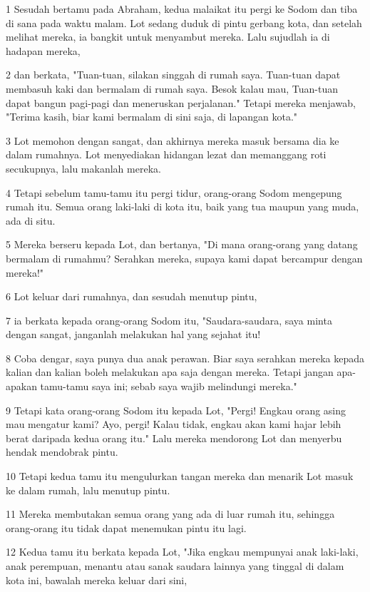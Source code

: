 \par 1 Sesudah bertamu pada Abraham, kedua malaikat itu pergi ke Sodom dan tiba di sana pada waktu malam. Lot sedang duduk di pintu gerbang kota, dan setelah melihat mereka, ia bangkit untuk menyambut mereka. Lalu sujudlah ia di hadapan mereka,
\par 2 dan berkata, "Tuan-tuan, silakan singgah di rumah saya. Tuan-tuan dapat membasuh kaki dan bermalam di rumah saya. Besok kalau mau, Tuan-tuan dapat bangun pagi-pagi dan meneruskan perjalanan." Tetapi mereka menjawab, "Terima kasih, biar kami bermalam di sini saja, di lapangan kota."
\par 3 Lot memohon dengan sangat, dan akhirnya mereka masuk bersama dia ke dalam rumahnya. Lot menyediakan hidangan lezat dan memanggang roti secukupnya, lalu makanlah mereka.
\par 4 Tetapi sebelum tamu-tamu itu pergi tidur, orang-orang Sodom mengepung rumah itu. Semua orang laki-laki di kota itu, baik yang tua maupun yang muda, ada di situ.
\par 5 Mereka berseru kepada Lot, dan bertanya, "Di mana orang-orang yang datang bermalam di rumahmu? Serahkan mereka, supaya kami dapat bercampur dengan mereka!"
\par 6 Lot keluar dari rumahnya, dan sesudah menutup pintu,
\par 7 ia berkata kepada orang-orang Sodom itu, "Saudara-saudara, saya minta dengan sangat, janganlah melakukan hal yang sejahat itu!
\par 8 Coba dengar, saya punya dua anak perawan. Biar saya serahkan mereka kepada kalian dan kalian boleh melakukan apa saja dengan mereka. Tetapi jangan apa-apakan tamu-tamu saya ini; sebab saya wajib melindungi mereka."
\par 9 Tetapi kata orang-orang Sodom itu kepada Lot, "Pergi! Engkau orang asing mau mengatur kami? Ayo, pergi! Kalau tidak, engkau akan kami hajar lebih berat daripada kedua orang itu." Lalu mereka mendorong Lot dan menyerbu hendak mendobrak pintu.
\par 10 Tetapi kedua tamu itu mengulurkan tangan mereka dan menarik Lot masuk ke dalam rumah, lalu menutup pintu.
\par 11 Mereka membutakan semua orang yang ada di luar rumah itu, sehingga orang-orang itu tidak dapat menemukan pintu itu lagi.
\par 12 Kedua tamu itu berkata kepada Lot, "Jika engkau mempunyai anak laki-laki, anak perempuan, menantu atau sanak saudara lainnya yang tinggal di dalam kota ini, bawalah mereka keluar dari sini,

